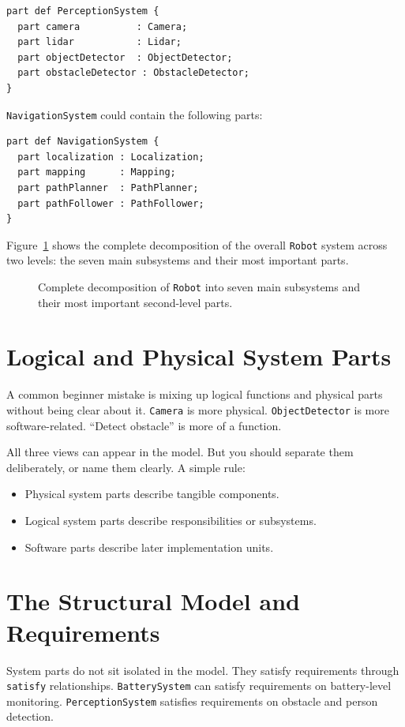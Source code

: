 \begin{lstlisting}
part def PerceptionSystem {
  part camera          : Camera;
  part lidar           : Lidar;
  part objectDetector  : ObjectDetector;
  part obstacleDetector : ObstacleDetector;
}
\end{lstlisting}

\texttt{NavigationSystem} could contain the following parts:

\begin{lstlisting}
part def NavigationSystem {
  part localization : Localization;
  part mapping      : Mapping;
  part pathPlanner  : PathPlanner;
  part pathFollower : PathFollower;
}
\end{lstlisting}

Figure~\ref{fig:kap08-part-def-baum} shows the complete decomposition of the overall \texttt{Robot} system across two levels: the seven main subsystems and their most important parts.

\begin{figure}[H]
  \centering
  \caption{Complete decomposition of \texttt{Robot} into seven main subsystems and their most important second-level parts.}
  \label{fig:kap08-part-def-baum}
\end{figure}

\section{Logical and Physical System Parts}
A common beginner mistake is mixing up logical functions and physical parts without being clear about it. \texttt{Camera} is more physical. \texttt{ObjectDetector} is more software-related. \enquote{Detect obstacle} is more of a function.

All three views can appear in the model. But you should separate them deliberately, or name them clearly. A simple rule:

\begin{itemize}
    \item Physical system parts describe tangible components.
    \item Logical system parts describe responsibilities or subsystems.
    \item Software parts describe later implementation units.
\end{itemize}

\section{The Structural Model and Requirements}
System parts do not sit isolated in the model. They satisfy requirements through \texttt{satisfy} relationships. \texttt{BatterySystem} can satisfy requirements on battery-level monitoring. \texttt{PerceptionSystem} satisfies requirements on obstacle and person detection.

